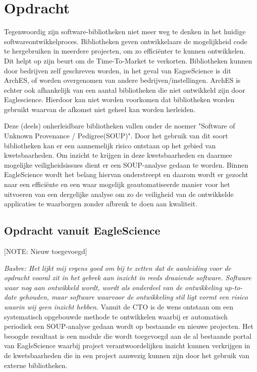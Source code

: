 
\chapter{Opdracht}\label{ch:opdracht} %


Tegenwoordig zijn software-bibliotheken niet meer weg te denken in het huidige software\-ontwikkelproces. Bibliotheken geven ontwikkelaars de mogelijkheid code te hergebruiken in meerdere projecten, om zo efficiënter te kunnen ontwikkelen. Dit helpt op zijn beurt om de Time-To-Market te verkorten. Bibliotheken kunnen door bedrijven zelf geschreven worden, in het geval van EagseScience is dit ArchES, of worden overgenomen van andere bedrijven/instellingen. ArchES is echter ook afhankelijk van een aantal bibliotheken die niet ontwikkeld zijn door Eaglescience. Hierdoor kan niet worden voorkomen dat bibliotheken worden gebruikt waarvan de afkomst niet geheel kan worden herleiden.

Deze (deels) onherleidbare bibliotheken vallen onder de noemer "Software of Unknown Provenance / Pedigree(SOUP)". Door het gebruik van dit soort bibliotheken kan er een aannemelijk risico ontstaan op het gebied van kwetsbaarheden. Om inzicht te krijgen in deze kwetsbaarheden en daarmee mogelijke veiligheidsissues dient er een SOUP-analyse gedaan te worden. Binnen EagleScience wordt het belang hiervan onderstreept en daarom wordt er gezocht naar een efficiënte en een waar mogelijk geautomatiseerde manier voor het uitvoeren van een dergelijke analyse om zo de veiligheid van de ontwikkelde applicaties te waarborgen zonder afbreuk te doen aan kwaliteit.

\section{Opdracht vanuit EagleScience}\label{sec:opdracht-vanuit-EagleScience}

[NOTE: Nieuw toegevoegd]

\textit{Basbre: Het lijkt mij ergens goed om bij te zetten dat de aanleiding voor de opdracht vooral zit in het gebrek aan inzicht in reeds draaiende software. Software waar nog aan ontwikkeld wordt, wordt als onderdeel van de ontwikkeling up-to-date gehouden, maar software waarvoor de ontwikkeling stil ligt vormt een risico waarin wij geen inzicht hebben.}
Vanuit de CTO is de wens ontstaan om een systematisch opgebouwde methode te ontwikkelen waarbij er automatisch periodiek een SOUP-analyse gedaan wordt op bestaande en nieuwe projecten. Het beoogde resultaat is een module die wordt toegevoegd aan de al bestaande portal van EagleScience waarbij project verantwoordelijken inzicht kunnen verkrijgen in de kwetsbaarheden die in een project aanwezig kunnen zijn door het gebruik van externe bibliotheken.


